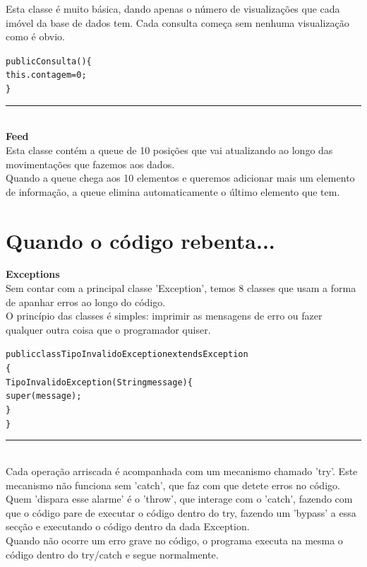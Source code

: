 \documentclass[12pt]{article}
\newenvironment{code}                    
{\textbf{
} \hspace{1cm} \hrulefill \\ 
\smallskip 
\begin{center}
\begin{minipage}{0.9\textwidth} 
\begin{alltt}\small}
{\end{alltt}
\end{minipage}
\end{center}
\hrule\smallskip
}
\begin{document}
Esta classe é muito básica, dando apenas o número de visualizações que cada imóvel da base de dados tem.
Cada consulta começa sem nenhuma visualização como é obvio.
\begin{code}
public Consulta()\{
        this.contagem = 0;
    \}
\end{code}
~\\

\textbf{Feed}
\newline
~\\

Esta classe contém a queue de 10 posições que vai atualizando ao longo das movimentações que fazemos aos dados.
~\\

Quando a queue chega aos 10 elementos e queremos adicionar mais um elemento de informação, a queue elimina automaticamente o último elemento que tem.
\pagebreak

\section{Quando o código rebenta...}

\textbf{Exceptions}
\newline
~\\

Sem contar com a principal classe 'Exception', temos 8 classes que usam a forma de apanhar erros ao longo do código.
\\

O princípio das classes é simples: imprimir as mensagens de erro ou fazer qualquer outra coisa que o programador quiser.
\newline
\begin{code}
public class TipoInvalidoException extends Exception
\{
    TipoInvalidoException(String message)\{
       super(message);
    \}
\}
\end{code}
~\\

Cada operação arriscada é acompanhada com um mecanismo chamado 'try'. Este mecanismo não funciona sem 'catch', que faz com que detete erros no código. Quem 'dispara esse alarme' é o 'throw', que interage com o 'catch', fazendo com que o código pare de executar o código dentro do try, fazendo um 'bypass' a essa secção e executando o código dentro da dada Exception. 
~\\

Quando não ocorre um erro grave no código, o programa executa na mesma o código dentro do try/catch e segue normalmente.  
\end{document}
